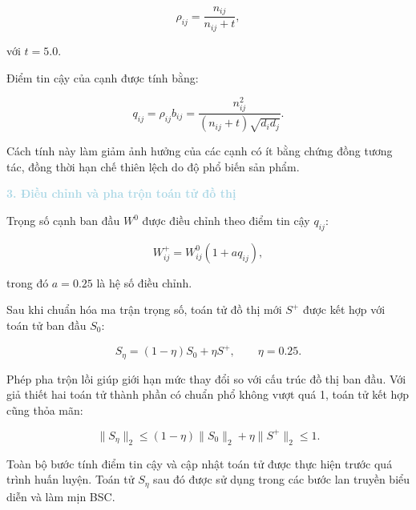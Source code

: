 \begin{equation}
\rho_{ij}
=
\frac{n_{ij}}{n_{ij}+t},
\end{equation}

với $t=5.0$.

Điểm tin cậy của cạnh được tính bằng:

\begin{equation}
q_{ij}
=
\rho_{ij}b_{ij}
=
\frac{n_{ij}^{2}}
{(n_{ij}+t)\sqrt{d_i d_j}}.
\end{equation}

Cách tính này làm giảm ảnh hưởng của các cạnh
có ít bằng chứng đồng tương tác,
đồng thời hạn chế thiên lệch do độ phổ biến sản phẩm.

\noindent\textcolor{lightblue}{\textbf{3. Điều chỉnh và pha trộn toán tử đồ thị}}

Trọng số cạnh ban đầu $W^0$ được điều chỉnh
theo điểm tin cậy $q_{ij}$:

\begin{equation}
W_{ij}^{+}
=
W_{ij}^{0}(1+a q_{ij}),
\end{equation}

trong đó $a=0.25$ là hệ số điều chỉnh.

Sau khi chuẩn hóa ma trận trọng số,
toán tử đồ thị mới $S^{+}$ được kết hợp
với toán tử ban đầu $S_0$:

\begin{equation}
S_{\eta}
=
(1-\eta)S_0+\eta S^{+},
\qquad \eta=0.25.
\end{equation}

Phép pha trộn lồi giúp giới hạn mức thay đổi
so với cấu trúc đồ thị ban đầu.
Với giả thiết hai toán tử thành phần
có chuẩn phổ không vượt quá 1,
toán tử kết hợp cũng thỏa mãn:

\begin{equation}
\lVert S_{\eta}\rVert_2
\leq
(1-\eta)\lVert S_0\rVert_2
+
\eta\lVert S^{+}\rVert_2
\leq 1.
\end{equation}

Toàn bộ bước tính điểm tin cậy và cập nhật toán tử
được thực hiện trước quá trình huấn luyện.
Toán tử $S_{\eta}$ sau đó được sử dụng
trong các bước lan truyền biểu diễn và làm mịn BSC.


